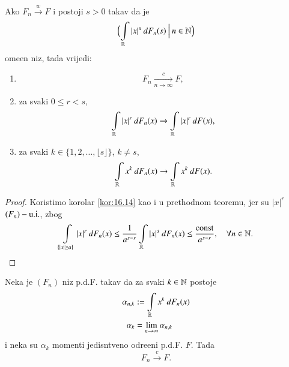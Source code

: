 \begin{kor} \label{kor:18.2}
    Ako $F_n \xrightarrow{w} F$ i postoji $s>0$ takav da je
    \begin{equation*}
        \Big( {\int\limits_{\mathbb{R}} |x|^s \: d F_n (s)} \: \Big| \: {n \in \mathbb{N}} \Big)
    \end{equation*}
    ome\dj en niz, tada vrijedi:
    \begin{enumerate}[label=(\roman*)]
        \item   \label{kor:18.2.1}
        \begin{equation*}
            F_n \xrightarrow[n \to \infty]{c} F,  
        \end{equation*}
        \item   \label{kor:18.2.2}
        za svaki $0 \leq r < s$,
        \begin{equation*}
            \int\limits_{\mathbb{R}} |x|^r \: d F_n (x) \to \int\limits_{\mathbb{R}} |x|^r \: d F (x),
        \end{equation*}
        \item   \label{kor:18.2.3}
        za svaki $k \in \{ 1, 2, \ldots, \lfloor s \rfloor \}$, $k \neq s$,
        \begin{equation*}
            \int\limits_{\mathbb{R}} x^k \: d F_n (x) \to \int\limits_{\mathbb{R}} x^k \: d F (x).
        \end{equation*}
    \end{enumerate}
\end{kor}

\begin{proof}
    Koristimo korolar \ref{kor:16.14} kao i u prethodnom teoremu, jer su $|x|^r$ $(F_n)-\mathrm{u.i.}$, zbog
    \begin{equation*}
        \int\limits_{\{ |x| \geq a \}} |x|^r \: d F_n (x) \leq \frac{1}{a^{s-r}} \int\limits_{\mathbb{R}} |x|^s \: d F_n (x) \leq \frac{\mathrm{const}}{a^{s-r}}, \quad \forall n \in \mathbb{N}.
    \end{equation*}
\end{proof}

\begin{tm}  \label{tm:18.3}
    Neka je $(F_n)$ niz p.d.F. takav da za svaki $k \in \mathbb{N}$ postoje
    \begin{equation*}
        \begin{aligned}
            \alpha_{n, k} &:= \int\limits_{\mathbb{R}} x^k \: d F_n (x)\\
            \alpha_k &= \lim\limits_{n \to \infty} \alpha_{n, k}  
        \end{aligned}
    \end{equation*}
    i neka su $\alpha_k$ momenti jedisntveno odre\dj eni p.d.F. $F$.
    Tada
    \begin{equation*}
        F_n \xrightarrow{c} F.
    \end{equation*}
\end{tm}


